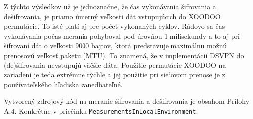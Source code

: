 \begin{table}[h!]
	\centering
	\caption{Výsledky z experimentálnych meraní funkcií na šifrovanie a dešifrovanie v prostredí lokálneho zariadenia}
	\label{tabmerlokal}
\end{table} 
Z týchto výsledkov už je jednoznačne, že čas vykonávania šifrovania a dešifrovania, je priamo úmerný veľkosti dát vstupujúcich do XOODOO permutácie. To isté platí aj pre počet vykonaných cyklov. Rádovo sa čas vykonávania počas merania pohyboval pod úrovňou 1 milisekundy a to aj pri šifrovaní dát o veľkosti 9000 bajtov, ktorá predstavuje maximálnu možnú prenosovú veľkosť paketu (MTU). To znamená, že v implementácií DSVPN do (de)šifrovania nevstupujú väčšie dáta. Použitie permutácie XOODOO na zariadení je teda extrémne rýchle a jej použitie pri sieťovom prenose je z používateľského hľadiska zanedbateľné. 

Vytvorený zdrojový kód na meranie šifrovania a dešifrovania je obsahom Prílohy A.4. Konkrétne v priečinku \lstinline|MeasurementsInLocalEnvironment|.
    
